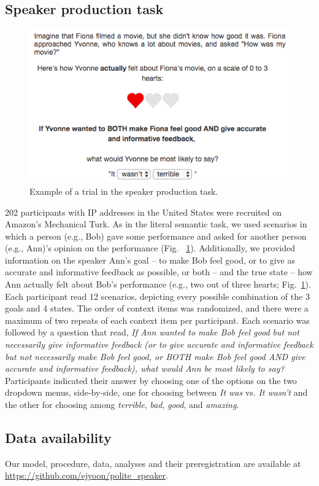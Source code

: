 \documentclass[9pt,twocolumn,twoside,lineno]{main_class_file}
\begin{document}
{\subsection*{Speaker production task}\label{speaker-production-task}

\begin{figure}[!h]
\begin{center}
\includegraphics[width=0.8\columnwidth]{fig/screenshot}
\caption{Example of a trial in the speaker production task.}\label{fig:screenshot}
\end{center}
\end{figure}

202 participants with IP addresses in the United States were recruited
on Amazon's Mechanical Turk. As in the literal semantic task, we
used scenarios in which a person (e.g., Bob) gave some performance and
asked for another person (e.g., Ann)'s opinion on the performance
(Fig. ~\ref{fig:screenshot}). Additionally, we provided information on
the speaker Ann's goal -- to make Bob feel good, or to give as accurate
and informative feedback as possible, or both -- and the true state --
how Ann actually felt about Bob's performance (e.g., two out of three
hearts;
Fig.~\ref{fig:screenshot}). Each participant read 12 scenarios,
depicting every possible combination of the 3 goals and 4 states.
The order of context items was randomized, and there were a maximum of
two repeats of each context item per participant. Each scenario was
followed by a question that read, \emph{If Ann wanted to make Bob
feel good but not necessarily give informative feedback (or to give
accurate and informative feedback but not necessarily make Bob feel
good, or BOTH make Bob feel good AND give accurate and informative
feedback), what would Ann be most likely to say?} Participants indicated
their answer by choosing one of the options on the two dropdown menus,
side-by-side, one for choosing between \emph{It was} vs. \emph{It
wasn't} and the other for choosing among \emph{terrible}, \emph{bad},
\emph{good}, and \emph{amazing.}

\subsection*{Data availability}\label{data-availability}

Our model, procedure, data, analyses and their preregistration
are available at \url{https://github.com/ejyoon/polite_speaker}.

}
\end{document}
